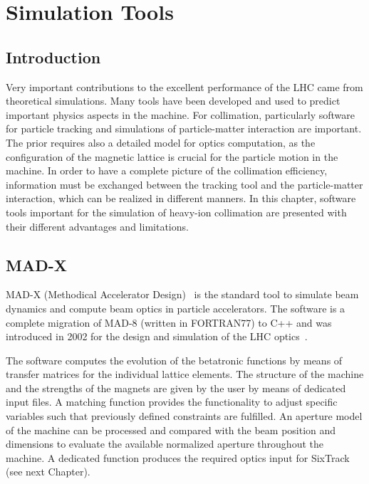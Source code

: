 \chapter{Simulation Tools}\label{chap:simulation_tools}
\section*{Introduction}
Very important contributions to the excellent performance of the LHC came from theoretical simulations. Many tools have been developed and used to predict important physics aspects in the machine. For collimation, particularly software for particle tracking and simulations of particle-matter interaction are important. The prior requires also a detailed model for optics computation, as the configuration of the magnetic lattice is crucial for the particle motion in the machine. In order to have a complete picture of the collimation efficiency, information must be exchanged between the tracking tool and the particle-matter interaction, which can be realized in different manners. In this chapter, software tools important for the simulation of heavy-ion collimation are presented with their different advantages and limitations. 






\section{MAD-X}
MAD-X (Methodical Accelerator Design)~\cite{MADXref01} is the standard tool to simulate beam dynamics and compute beam optics in particle accelerators. The software is a complete migration of MAD-8 (written in FORTRAN77) to C++ and was introduced in 2002 for the design and simulation of the LHC optics~\cite{MADXref02}.

The software computes the evolution of the betatronic functions by means of transfer matrices for the individual lattice elements. The structure of the machine and the strengths of the magnets are given by the user by means of dedicated input files. A matching function provides the functionality to adjust specific variables such that previously defined constraints are fulfilled. An aperture model of the machine can be processed and compared with the beam position and dimensions to evaluate the available normalized aperture throughout the machine. A dedicated function produces the required optics input for SixTrack (see next Chapter). 



